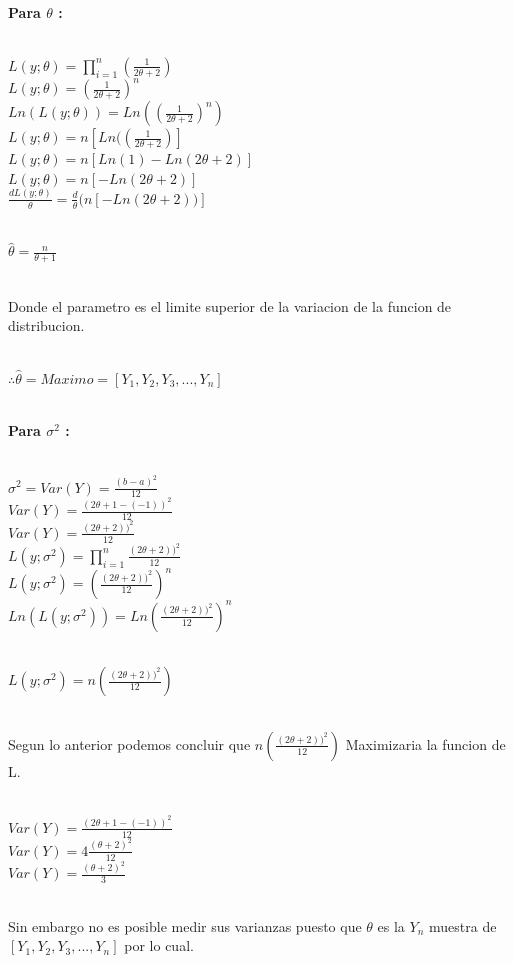 \documentclass[letterpaper,12pt,onecolumn,titlepage]{article}
\begin{document}
~\\ \textbf{Para $\theta$ :}

~\\ $L(y;\theta) = \prod_{i=1}^n{}(\frac{1}{2\theta +2})$
~\\ $L(y;\theta) = (\frac{1}{2\theta +2})^{n}$
~\\ $Ln(L(y;\theta)) = Ln((\frac{1}{2\theta +2})^{n})$
~\\ $L(y;\theta) = n[Ln((\frac{1}{2\theta +2})]$
~\\ $L(y;\theta) = n[Ln(1)-Ln({2\theta+2})]$
~\\ $L(y;\theta) = n[-Ln({2\theta+2})]$
~\\ $\frac{dL(y;\theta)}{\theta} = \frac{d}{\theta}(n[-Ln({2\theta+2}))]$

~\\ $\hat{\theta} = \frac{n}{\theta+1}$

~\\ Donde el parametro es el limite superior de la variacion de la funcion de distribucion. 

~\\ $\therefore \hat{\theta} = Maximo = [Y_{1}, Y_{2}, Y_{3},...,Y_{n}]$ 

~\\ \textbf{Para $\sigma^{2}$ :}

~\\ $\sigma^{2} = Var(Y) = \frac{(b-a)^2}{12}$
~\\ $Var(Y) = \frac{(2\theta+1-(-1))^2}{12}$
~\\ $Var(Y) = \frac{(2\theta+2))^2}{12}$
~\\ $L(y;\sigma^{2}) = \prod_{i=1}^n{} \frac{(2\theta+2))^2}{12}$
~\\ $L(y;\sigma^{2}) = (\frac{(2\theta+2))^2}{12})^{n}$
~\\ $Ln(L(y;\sigma^{2})) = Ln(\frac{(2\theta+2))^2}{12})^{n}$

~\\ $L(y;\sigma^{2}) = n(\frac{(2\theta+2))^2}{12})$

~\\ Segun lo anterior podemos concluir que \textbf{{$n(\frac{(2\theta+2))^2}{12})$}} Maximizaria la funcion de L.  

~\\ $Var(Y) = \frac{(2\theta+1-(-1))^2}{12}$
~\\ $Var(Y) = 4\frac{(\theta+2)^2}{12}$
~\\ $Var(Y) = \frac{(\theta+2)^2}{3}$

~\\ Sin embargo no es posible medir sus varianzas puesto que $\theta$ es la $Y_{n}$ muestra de $[Y_{1}, Y_{2}, Y_{3},...,Y_{n}]$ por lo cual. 
\end{document}
